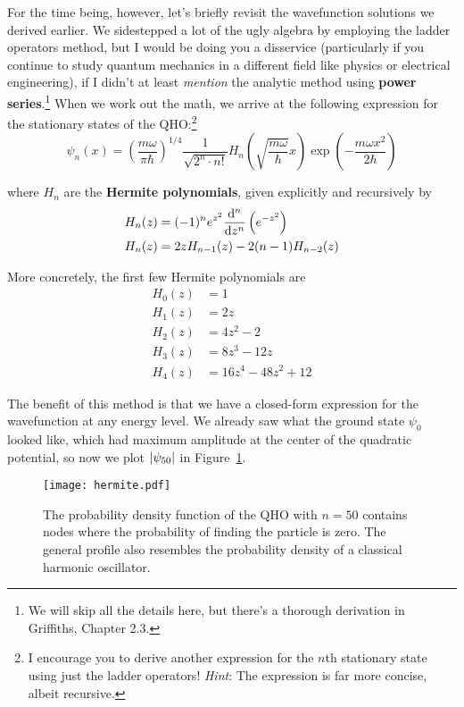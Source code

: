 For the time being, however, let's briefly revisit the wavefunction solutions we derived earlier. We sidestepped a lot of the ugly algebra by employing the ladder operators method, but I would be doing you a disservice (particularly if you continue to study quantum mechanics in a different field like physics or electrical engineering), if I didn't at least \emph{mention} the analytic method using \textbf{power series}.\footnote{We will skip all the details here, but there's a thorough derivation in Griffiths, Chapter 2.3.} When we work out the math, we arrive at the following expression for the stationary states of the QHO:\footnote{I encourage you to derive another expression for the $n$th stationary state using just the ladder operators! \emph{Hint}: The expression is far more concise, albeit recursive.} 
\begin{equation}
	\psi_n(x) = \left(\frac{m\omega}{\pi\hbar}\right)^{1/4} \frac{1}{\sqrt{2^n \cdot n!}} H_n \left(\sqrt{\frac{m\omega}{\hbar}}x\right) \exp \left(-\frac{m\omega x^2}{2\hbar}\right) \label{eq:pow-qho}
\end{equation}

where $H_n$ are the \textbf{Hermite polynomials}, given explicitly and recursively by
\begin{align*}
	H_n(z) &= (-1)^n e^{z^2} \dv[n]{z} \left( e^{-z^2} \right) \\
	H_n(z) &= 2zH_{n-1}(z) - 2(n-1)H_{n-2}(z)
\end{align*}

More concretely, the first few Hermite polynomials are
\begin{align*}
	H_0(z) &= 1 \\
	H_1(z) &= 2z \\
	H_2(z) &= 4z^2-2 \\
	H_3(z) &= 8z^3 - 12z \\
	H_4(z) &= 16z^4 - 48z^2 + 12
\end{align*}

The benefit of this method is that we have a closed-form expression for the wavefunction at any energy level. We already saw what the ground state $\psi_0$ looked like, which had maximum amplitude at the center of the quadratic potential, so now we plot $\abs{\psi_{50}}$ in Figure~\ref{fig:qho-50}.

\begin{figure}[!h]
	\centering
	\texttt{[image: hermite.pdf]}
	\caption{The probability density function of the QHO with $n=50$ contains nodes where the probability of finding the particle is zero. The general profile also resembles the probability density of a classical harmonic oscillator.}
	\label{fig:qho-50}
\end{figure}

